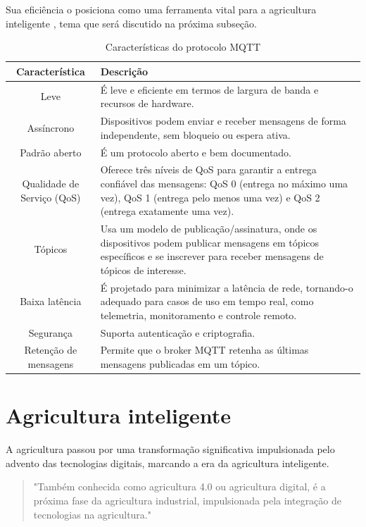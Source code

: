 Sua eficiência o posiciona como uma ferramenta vital para a agricultura inteligente \parencite{Gurjeet_smart2022}, tema que será discutido na próxima subseção.

\begin{table}[!htb]
  \caption{Características do protocolo MQTT} \label{tab:caract_mqtt}
  \begin{tabularx}{\textwidth}{|c|X|} \hline
    \textbf{Característica} & \textbf{Descrição} \\ \hline
    Leve & É leve e eficiente em termos de largura de banda e recursos de hardware. \\ \hline
    Assíncrono & Dispositivos podem enviar e receber mensagens de forma independente, sem bloqueio ou espera ativa. \\ \hline
    Padrão aberto & É um protocolo aberto e bem documentado. \\ \hline
    Qualidade de Serviço (QoS) & Oferece três níveis de QoS para garantir a entrega confiável das mensagens: QoS 0 (entrega no máximo uma vez), QoS 1 (entrega pelo menos uma vez) e QoS 2 (entrega exatamente uma vez). \\ \hline
    Tópicos & Usa um modelo de publicação/assinatura, onde os dispositivos podem publicar mensagens em tópicos específicos e se inscrever para receber mensagens de tópicos de interesse. \\ \hline  
    Baixa latência &  É projetado para minimizar a latência de rede, tornando-o adequado para casos de uso em tempo real, como telemetria, monitoramento e controle remoto. \\ \hline
    Segurança & Suporta autenticação e criptografia. \\ \hline
    Retenção de mensagens & Permite que o broker MQTT retenha as últimas mensagens publicadas em um tópico. \\ \hline  
  \end{tabularx}
\end{table}

\section{Agricultura inteligente}
A agricultura passou por uma transformação significativa impulsionada pelo advento das tecnologias digitais, marcando a era da agricultura inteligente. 

\begin{quote}
  "Também conhecida como agricultura 4.0 ou agricultura digital, é a próxima fase da agricultura industrial, impulsionada pela integração de tecnologias na agricultura." \parencite{Gurjeet_smart2022}
\end{quote}

